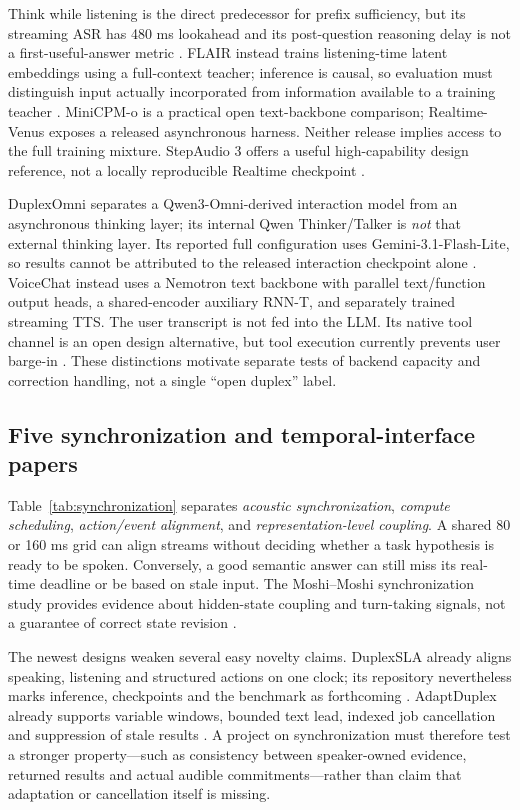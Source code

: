 \documentclass{article}
\begin{document}
Think while listening is the direct predecessor for prefix sufficiency, but its streaming ASR has 480 ms lookahead and its post-question reasoning delay is not a first-useful-answer metric \citep{thinklisten}. FLAIR instead trains listening-time latent embeddings using a full-context teacher; inference is causal, so evaluation must distinguish input actually incorporated from information available to a training teacher \citep{flair}. MiniCPM-o is a practical open text-backbone comparison; Realtime-Venus exposes a released asynchronous harness. Neither release implies access to the full training mixture. StepAudio 3 offers a useful high-capability design reference, not a locally reproducible Realtime checkpoint \citep{minicpm,venus,step3}.

DuplexOmni separates a Qwen3-Omni-derived interaction model from an asynchronous thinking layer; its internal Qwen Thinker/Talker is \emph{not} that external thinking layer. Its reported full configuration uses Gemini-3.1-Flash-Lite, so results cannot be attributed to the released interaction checkpoint alone \citep{duplexomni}. VoiceChat instead uses a Nemotron text backbone with parallel text/function output heads, a shared-encoder auxiliary RNN-T, and separately trained streaming TTS. The user transcript is not fed into the LLM. Its native tool channel is an open design alternative, but tool execution currently prevents user barge-in \citep{voicechat}. These distinctions motivate separate tests of backend capacity and correction handling, not a single ``open duplex'' label.



\subsection{Five synchronization and temporal-interface papers}

Table~\ref{tab:synchronization} separates \emph{acoustic synchronization}, \emph{compute scheduling}, \emph{action/event alignment}, and \emph{representation-level coupling}. A shared 80 or 160 ms grid can align streams without deciding whether a task hypothesis is ready to be spoken. Conversely, a good semantic answer can still miss its real-time deadline or be based on stale input. The Moshi--Moshi synchronization study provides evidence about hidden-state coupling and turn-taking signals, not a guarantee of correct state revision \citep{synchrony}.

The newest designs weaken several easy novelty claims. DuplexSLA already aligns speaking, listening and structured actions on one clock; its repository nevertheless marks inference, checkpoints and the benchmark as forthcoming \citep{duplexsla}. AdaptDuplex already supports variable windows, bounded text lead, indexed job cancellation and suppression of stale results \citep{adapt}. A project on synchronization must therefore test a stronger property---such as consistency between speaker-owned evidence, returned results and actual audible commitments---rather than claim that adaptation or cancellation itself is missing.
\end{document}
